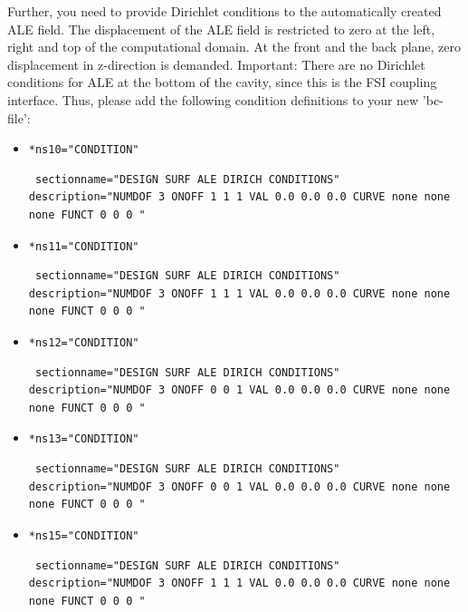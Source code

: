 Further, you need to provide Dirichlet conditions to the automatically created ALE field. The displacement of the 
ALE field is restricted to zero at the left, right and top of the computational domain. At the front and the back plane,
zero displacement in z-direction is demanded. Important: There are no Dirichlet conditions for ALE
at the bottom of the cavity, since this is the FSI coupling interface. Thus, please add the following condition definitions to your new 'bc-file':

\begin{itemize}
 \item \verb|*ns10="CONDITION"| 
\begin{small} \begin{verbatim} sectionname="DESIGN SURF ALE DIRICH CONDITIONS"
description="NUMDOF 3 ONOFF 1 1 1 VAL 0.0 0.0 0.0 CURVE none none none FUNCT 0 0 0 "
\end{verbatim} \end{small}

 \item \verb|*ns11="CONDITION"| 
\begin{small} \begin{verbatim} sectionname="DESIGN SURF ALE DIRICH CONDITIONS"
description="NUMDOF 3 ONOFF 1 1 1 VAL 0.0 0.0 0.0 CURVE none none none FUNCT 0 0 0 "
\end{verbatim} \end{small}

 \item \verb|*ns12="CONDITION"| 
\begin{small} \begin{verbatim} sectionname="DESIGN SURF ALE DIRICH CONDITIONS"
description="NUMDOF 3 ONOFF 0 0 1 VAL 0.0 0.0 0.0 CURVE none none none FUNCT 0 0 0 "
\end{verbatim} \end{small}

 \item \verb|*ns13="CONDITION"| 
\begin{small} \begin{verbatim} sectionname="DESIGN SURF ALE DIRICH CONDITIONS"
description="NUMDOF 3 ONOFF 0 0 1 VAL 0.0 0.0 0.0 CURVE none none none FUNCT 0 0 0 "
\end{verbatim} \end{small}

 \item \verb|*ns15="CONDITION"| 
\begin{small} \begin{verbatim} sectionname="DESIGN SURF ALE DIRICH CONDITIONS"
description="NUMDOF 3 ONOFF 1 1 1 VAL 0.0 0.0 0.0 CURVE none none none FUNCT 0 0 0 "
\end{verbatim} \end{small}


\end{itemize}
